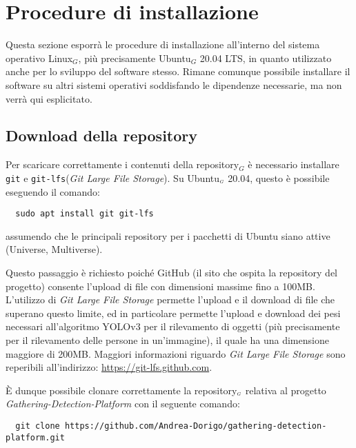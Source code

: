 \chapter{Procedure di installazione}\label{ProceduraDiInstallazione}
Questa sezione esporrà le procedure di installazione all'interno del sistema operativo Linux$_G$, più precisamente Ubuntu$_G$ 20.04 LTS, in quanto utilizzato anche per lo sviluppo del software stesso.
Rimane comunque possibile installare il software su altri sistemi operativi soddisfando le dipendenze necessarie, ma non verrà qui esplicitato.

\section{Download della repository}\label{ProceduraDiInstallazioneDownloadRepo}
Per scaricare correttamente i contenuti della repository$_G$ è necessario installare \texttt{git} e \texttt{git-lfs}(\textit{Git Large File Storage}).
Su Ubuntu$_{\scaleto{G}{3pt}}$ 20.04, questo è possibile eseguendo il comando:
\begin{lstlisting}
  sudo apt install git git-lfs
\end{lstlisting}
assumendo che le principali repository per i pacchetti di Ubuntu siano attive (Universe, Multiverse).

Questo passaggio è richiesto poiché GitHub (il sito che ospita la repository del progetto) consente l'upload di file con dimensioni massime fino a 100MB.
L'utilizzo di \textit{Git Large File Storage} permette l'upload e il download di file che superano questo limite,  ed in particolare permette l'upload e download dei pesi necessari all'algoritmo YOLOv3 per il rilevamento di oggetti (più precisamente per il rilevamento delle persone in un'immagine), il quale ha una dimensione maggiore di 200MB. Maggiori informazioni riguardo \textit{Git Large File Storage} sono reperibili all'indirizzo:
\newline
\url{https://git-lfs.github.com}.

È dunque possibile clonare correttamente la repository$_{\scaleto{G}{3pt}}$ relativa al progetto \textit{Gathering-Detection-Platform} con il seguente comando:
\begin{lstlisting}
  git clone https://github.com/Andrea-Dorigo/gathering-detection-platform.git
\end{lstlisting}

